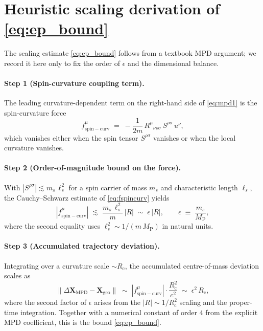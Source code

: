 \section{Heuristic scaling derivation of \eqref{eq:ep_bound}}
\label{sec:scaling}
The scaling estimate \eqref{eq:ep_bound} follows from a textbook MPD
argument; we record it here only to fix the order of $\epsilon$ and
the dimensional balance.

\paragraph{Step 1 (Spin-curvature coupling term).}
The leading curvature-dependent term on the right-hand side of
\eqref{eq:mpd1} is the spin-curvature force
\begin{equation}\label{eq:fspincurv}
  f^{\mu}_{\mathrm{spin\!-\!curv}}
  \;=\; -\frac{1}{2m}\,R^{\mu}{}_{\nu\rho\sigma}\,S^{\rho\sigma}\,u^{\nu},
\end{equation}
which vanishes either when the spin tensor $S^{\rho\sigma}$ vanishes
or when the local curvature vanishes.

\paragraph{Step 2 (Order-of-magnitude bound on the force).}
With $|S^{\rho\sigma}| \lesssim m_s\,\ell_s^2$ for a spin carrier of
mass $m_s$ and characteristic length $\ell_s$, the Cauchy--Schwarz
estimate of \eqref{eq:fspincurv} yields
\begin{equation}\label{eq:fmag}
  |f^{\mu}_{\mathrm{spin\!-\!curv}}|
  \;\lesssim\; \frac{m_s\,\ell_s^2}{m}\,|R|
  \;\sim\; \epsilon\,|R|,
  \qquad \epsilon \;\equiv\; \frac{m_s}{M_{\mathrm{P}}},
\end{equation}
where the second equality uses $\ell_s^2 \sim 1 / (m\,M_{\mathrm{P}})$
in natural units.

\paragraph{Step 3 (Accumulated trajectory deviation).}
Integrating over a curvature scale $\sim R_{\mathrm{c}}$, the
accumulated centre-of-mass deviation scales as
\begin{equation}\label{eq:dxscale}
  \big\|\Delta\mathbf{X}_{\mathrm{MPD}}-\mathbf{X}_{\mathrm{geo}}\big\|
  \;\sim\;
  |f^{\mu}_{\mathrm{spin\!-\!curv}}|\cdot \frac{R_{\mathrm{c}}^{2}}{c^{2}}
  \;\sim\;
  \epsilon^{2}\,R_{\mathrm{c}},
\end{equation}
where the second factor of $\epsilon$ arises from the
$|R|\sim 1/R_{\mathrm{c}}^{2}$ scaling and the proper-time
integration. Together with a numerical constant of order $4$ from
the explicit MPD coefficient, this is the bound \eqref{eq:ep_bound}.

